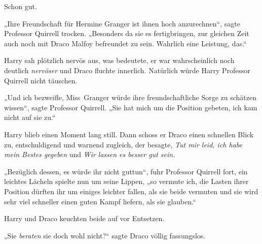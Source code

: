 Schon gut.

„Ihre Freundschaft für Hermine Granger ist ihnen hoch anzurechnen“, sagte Professor Quirrell trocken.
„Besonders da sie es fertigbringen, zur gleichen Zeit auch noch mit Draco Malfoy befreundet zu sein. Wahrlich eine Leistung, das.“

Harry sah plötzlich nervös aus, was bedeutete, er war wahrscheinlich noch deutlich \emph{nervöser} und Draco fluchte innerlich. Natürlich würde Harry Professor Quirrell nicht täuschen.

„Und ich bezweifle, Miss~Granger würde ihre freundschaftliche Sorge zu schätzen wissen“, sagte Professor Quirrell.
„Sie hat mich um die Position gebeten, ich kam nicht auf sie zu.“

Harry blieb einen Moment lang still. Dann schoss er Draco einen schnellen Blick zu, entschuldigend und warnend zugleich, der besagte, \emph{Tut mir leid, ich habe mein Bestes gegeben} und \emph{Wir} \emph{lassen es besser gut sein.}

„Bezüglich dessen, es würde ihr nicht guttun“, fuhr Professor Quirrell fort, ein leichtes Lächeln spielte nun um seine Lippen, „so vermute ich, die Lasten ihrer Position dürften ihr um einiges leichter fallen, als sie beide vermuten und sie wird sehr viel schneller einen guten Kampf liefern, als sie glauben.“

Harry und Draco keuchten beide auf vor Entsetzen.

„Sie \emph{beraten} sie doch wohl nicht?“ sagte Draco völlig fassungslos.

